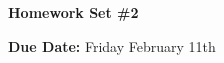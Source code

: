 


\thispagestyle{fancy}






\begin{center}
{\huge \textbf{Homework Set \#2}}
\large

{\textbf{ Due Date:} Friday February 11th  }
\end{center}

